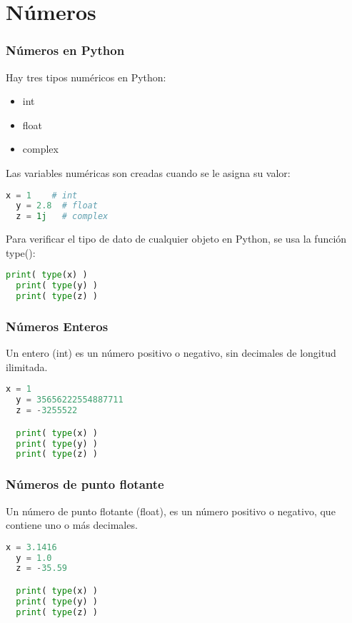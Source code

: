 \section{Números}

\begin{frame}[fragile]
  \frametitle{Números en Python}

  \vspace{\baselineskip}
  Hay tres tipos numéricos en Python:

  \begin{itemize}
    \item \textcolor{codeKeyword}{int}
    \item \textcolor{codeKeyword}{float}
    \item \textcolor{codeKeyword}{complex}
  \end{itemize}

  Las variables numéricas son creadas cuando se le asigna su valor:

  \begin{lstlisting}[language=Python]
  x = 1    # int
  y = 2.8  # float
  z = 1j   # complex
  \end{lstlisting}

  \pausa
  Para verificar el tipo de dato de cualquier objeto en Python, se usa la
  función \textcolor{codeKeyword}{type}():

  \begin{lstlisting}[language=Python]
  print( type(x) )
  print( type(y) )
  print( type(z) )
  \end{lstlisting}
\end{frame}

\begin{frame}[fragile]
  \frametitle{Números Enteros}

  Un entero (\textcolor{codeKeyword}{int}) es un número positivo o
  negativo, sin decimales de longitud ilimitada.

  \vspace{\baselineskip}
  \begin{lstlisting}[language=Python]
  x = 1
  y = 35656222554887711
  z = -3255522

  print( type(x) )
  print( type(y) )
  print( type(z) )
  \end{lstlisting}
\end{frame}

\begin{frame}[fragile]
  \frametitle{Números de punto flotante}

  Un número de punto flotante (\textcolor{codeKeyword}{float}), es un número
  positivo o negativo, que contiene uno o más decimales.

  \vspace{\baselineskip}
  \begin{lstlisting}[language=Python]
  x = 3.1416
  y = 1.0
  z = -35.59

  print( type(x) )
  print( type(y) )
  print( type(z) )
  \end{lstlisting}
\end{frame}

